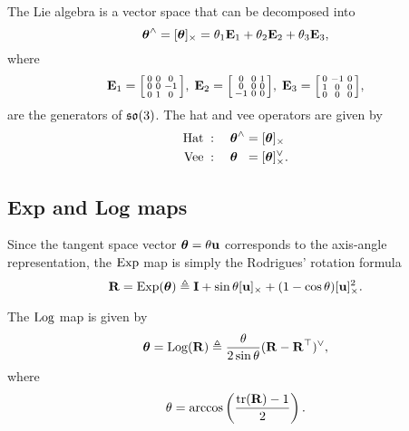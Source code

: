 The Lie algebra is a vector space that can be decomposed into
\begin{equation}
  {\boldsymbol{\mathbf{\theta}}}^\wedge = [{\boldsymbol{\mathbf{\theta}}}]_\times = \theta_1 {\boldsymbol{\mathbf{E}}}_1 + \theta_2 {\boldsymbol{\mathbf{E}}}_2 + \theta_3 {\boldsymbol{\mathbf{E}}}_3,
\end{equation}
where
\begin{equation}
  {\boldsymbol{\mathbf{E}}}_1 =
  \begin{bsmallmatrix}
    0 & 0 & 0\\
    0 & 0 & -1\\
    0 & 1 & 0
  \end{bsmallmatrix}, \;
  {\boldsymbol{\mathbf{E}}}_2 =
  \begin{bsmallmatrix}
    0 & 0 & 1\\
    0 & 0 & 0\\
    -1 & 0 & 0
  \end{bsmallmatrix}, \;
  {\boldsymbol{\mathbf{E}}}_3 =
  \begin{bsmallmatrix}
    0 & -1 & 0\\
    1 & 0 & 0\\
    0 & 0 & 0
  \end{bsmallmatrix},
\end{equation}
are the generators of ${\mathfrak {so}}(3)$. The hat and vee operators are given by
\begin{align}
\begin{alignedat}{2}
  \text{Hat} \; &: \quad {\boldsymbol{\mathbf{\theta}}}^\wedge &&= [{\boldsymbol{\mathbf{\theta}}}]_\times\\
  \text{Vee} \; &: \quad {\boldsymbol{\mathbf{\theta}}} &&= [{\boldsymbol{\mathbf{\theta}}}]^\vee_\times.
\end{alignedat}
\end{align}

\subsection{Exp and Log maps} \label{sec:Exp-Log-SO3}
Since the tangent space vector ${\boldsymbol{\mathbf{\theta}}} = \theta {\boldsymbol{\mathbf{u}}}$ corresponds to the axis-angle representation, the $\operatorname*{Exp}$ map is simply the Rodrigues' rotation formula
\begin{equation} \label{eq:Exp-SO3}
  {\boldsymbol{\mathbf{R}}} = \operatorname*{Exp}({\boldsymbol{\mathbf{\theta}}}) \triangleq {\boldsymbol{\mathbf{I}}} + \sin \theta [{\boldsymbol{\mathbf{u}}}]_\times + (1 - \cos \theta) [{\boldsymbol{\mathbf{u}}}]^2_\times.
\end{equation}

The $\operatorname*{Log}$ map is given by
\begin{equation} \label{eq:Log-SO3}
  {\boldsymbol{\mathbf{\theta}}} = \operatorname*{Log}({\boldsymbol{\mathbf{R}}}) \triangleq \frac{\theta}{2 \sin \theta} ({\boldsymbol{\mathbf{R}}} - {\boldsymbol{\mathbf{R}}}^{\top})^\vee,
\end{equation}
where
\begin{equation}
  \theta = \arccos \left( \frac{\operatorname{tr}({\boldsymbol{\mathbf{R}}}) - 1}{2} \right).
\end{equation}

